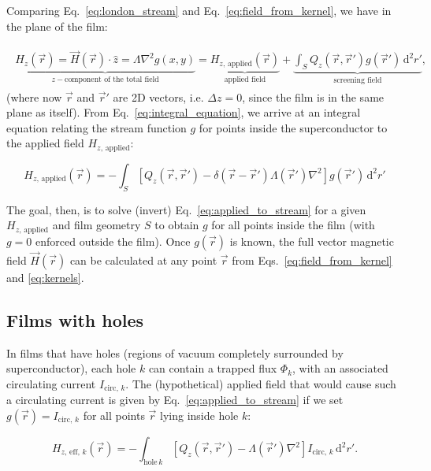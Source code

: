 \documentclass[preprint,12pt]{elsarticle}
\newcounter{bla}
\begin{document}
Comparing Eq.~\ref{eq:london_stream} and Eq.~\ref{eq:field_from_kernel}, we have in the plane of the film:

\begin{align}
    \label{eq:integral_equation}
    \begin{split}
        \underbrace{H_z(\vec{r}) = \vec{H}(\vec{r})\cdot\hat{z}
        = \Lambda\nabla^2g(x, y)}_{z-\text{component of the total field}}
        = \underbrace{H_{z,\,\mathrm{applied}}(\vec{r})}_{\text{applied field}}
        + \underbrace{\int_S Q_z(\vec{r},\vec{r}')g(\vec{r}')\,\mathrm{d}^2r'}_{\text{screening field}},
    \end{split}
\end{align}
(where now $\vec{r}$ and $\vec{r}'$ are 2D vectors, i.e. $\Delta z=0$, since the film is in the same plane as itself). From Eq.~\ref{eq:integral_equation}, we arrive at an integral equation relating the stream function $g$ for points inside the superconductor to the applied field $H_{z,\,\mathrm{applied}}$:

\begin{equation}
    \label{eq:applied_to_stream}
    H_{z,\,\mathrm{applied}}(\vec{r})
    = -\int_S\left[
        Q_z(\vec{r},\vec{r}')-\delta(\vec{r}-\vec{r}')\Lambda(\vec{r}')\nabla^2\right
    ]g(\vec{r}')\,\mathrm{d}^2r'
\end{equation}

The goal, then, is to solve (invert) Eq.~\ref{eq:applied_to_stream} for a given $H_{z,\,\mathrm{applied}}$ and film geometry $S$ to obtain $g$ for all points inside the film (with $g=0$ enforced outside the film). Once $g(\vec{r})$ is known, the full vector magnetic field $\vec{H}(\vec{r})$ can be calculated at any point $\vec{r}$
from Eqs.~\ref{eq:field_from_kernel} and \ref{eq:kernels}.

\subsection{Films with holes}
\label{section:model:holes}

In films that have holes (regions of vacuum completely surrounded by superconductor), each hole $k$ can contain a trapped flux $\Phi_k$, with an associated circulating current $I_{\mathrm{circ},\,k}$. The (hypothetical) applied field that would cause such a circulating current is given by Eq.~\ref{eq:applied_to_stream} if we set $g(\vec{r})=I_{\mathrm{circ},\,k}$ for all points $\vec{r}$ lying inside hole $k$:

\begin{equation}
    \label{eq:Heff}
    H_{z,\,\mathrm{eff},\,k}(\vec{r}) = -\int_{\mathrm{hole}\,k}[
        Q_z(\vec{r},\vec{r}')-\Lambda(\vec{r}')\nabla^2
    ] I_{\mathrm{circ},\,k} \,\mathrm{d}^2r'.   
\end{equation}
\end{document}
